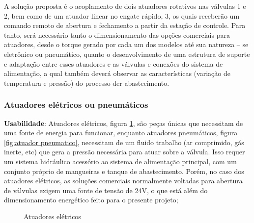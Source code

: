 \par A solução proposta é o acoplamento de dois atuadores rotativos nas válvulas 1 e 2, bem como de um atuador linear no engate rápido, 3, os quais receberão um comando remoto de abertura e fechamento a partir da estação de controle. Para tanto, será necessário tanto o dimensionamento das opções comerciais para atuadores, desde o torque gerado por cada um dos modelos até sua natureza – se eletrônico ou pneumático, quanto o desenvolvimento de uma estrutura de suporte e adaptação entre esses atuadores e as válvulas e conexões do sistema de alimentação, a qual também deverá observar as características (variação de temperatura e pressão) do processo der abastecimento. 

\subsubsection{Atuadores elétricos ou pneumáticos}

\par \textbf{Usabilidade}: Atuadores elétricos, figura \ref{fig:atuador eletrico}, são peças únicas que necessitam de uma fonte de energia para funcionar, enquanto atuadores pneumáticos, figura \ref{fig:atuador pneumatico}, necessitam de um fluido trabalho (ar comprimido, gás inerte, etc) que gera a pressão necessária para atuar sobre a válvula. Isso requer um sistema hidráulico acessório ao sistema de alimentação principal, com um conjunto próprio de mangueiras e tanque de abastecimento. Porém, no caso dos atuadores elétricos, as soluções comerciais normalmente voltadas para abertura de válvulas exigem uma fonte de tensão de 24V, o que está além do dimensionamento energético feito para o presente projeto;

\begin{figure}[h]
\centering
{}
\qquad
{}
\caption{Atuadores elétricos}
\label{fig:atuador eletrico}
\end{figure}

